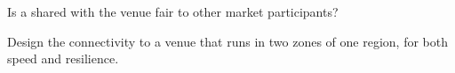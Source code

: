 \begin{interviewq}\label{iq:nw:private-connectivity-to-crypto-venues:5}
Is a shared  with the venue fair to other market participants?
\end{interviewq}

\begin{interviewq}\label{iq:nw:private-connectivity-to-crypto-venues:6}
Design the connectivity to a venue that runs in two zones of one region, for both speed and resilience.
\end{interviewq}
